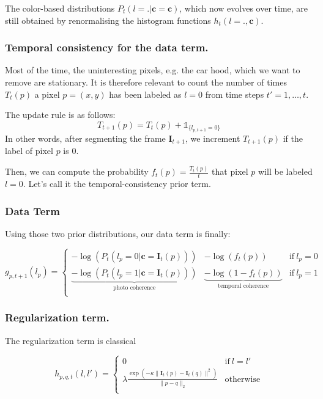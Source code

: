 \documentclass[a4paper,twoside,10pt]{article}
\begin{document}
The color-based distributions $P_t(l = . | \mathbf{c} = \mathbf{c})$, which now evolves over time, are still obtained by renormalising the histogram functions $h_{t}(l = ., \mathbf{c})$.



\subsubsection{Temporal consistency for the data term.}
Most of the time, the uninteresting pixels, e.g. the car hood, which we want to remove are stationary. It is therefore relevant to count the number of times $T_t(p)$ a pixel $p=(x,y)$ has been labeled as $l=0$ from time steps $t'=1,\dots,t$.

The update rule is as follows:
\begin{equation}
T_{t+1}(p) = T_t(p) + \mathds{1}_{\{l_{p,t+1} = 0\}}
\end{equation}
In other words, after segmenting the frame $\mathbf{I}_{t+1}$, we increment $T_{t+1}(p)$ if the label of pixel $p$ is $0$.

Then, we can compute the probability $f_t(p) = \displaystyle\frac{T_t(p)}{t}$ that pixel $p$ will be labeled $l=0$. Let's call it the temporal-consistency prior term.


\subsubsection{Data Term}
Using those two prior distributions, our data term is finally:

\begin{equation}
g_{p,t+1}(l_p) = \displaystyle \left\{\begin{array}{ccc}
-\log(P_t(l_p=0 | \mathbf{c}=\mathbf{I}_t(p))) & -\log(f_t(p)) & \text{if}\ l_p = 0 \\
\underbrace{-\log(P_t(l_p=1 | \mathbf{c}=\mathbf{I}_t(p)))}_{\text{photo coherence}} & \underbrace{- \log(1-f_t(p))}_{\text{temporal coherence}} & \text{if}\ l_p = 1 \\
\end{array} \right.
\end{equation}



\subsubsection{Regularization term.}
The regularization term is classical

\begin{equation}
h_{p,q,t}(l, l') = \displaystyle \left\{\begin{array}{cc}
0 & \textrm{if} \ l = l' \\
\lambda \frac{\exp(-\kappa \|\mathbf{I}_t(p) - \mathbf{I}_t(q)\|^2)}{\|p-q\|_2} & \text{otherwise}\\
\end{array}\right.
\end{equation}
\end{document}
